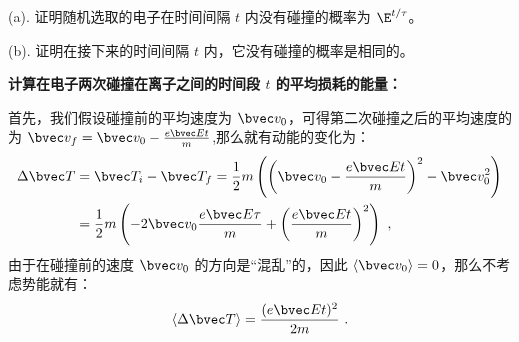 \begin{example}{}
(a). 证明随机选取的电子在时间间隔 $t$ 内没有碰撞的概率为 $\E^{t/\tau}$。

(b). 证明在接下来的时间间隔 $t$ 内，它没有碰撞的概率是相同的。
\end{example}
\begin{example}{}
\textbf{计算在电子两次碰撞在离子之间的时间段 $t$ 的平均损耗的能量：}

首先，我们假设碰撞前的平均速度为 $\bvec v_0$，可得第二次碰撞之后的平均速度的为 $\bvec v_f=\bvec v_0 -\frac{e\bvec E t}{m}$,那么就有动能的变化为：
\begin{align}
\Delta \bvec T &= \bvec T_i-\bvec T_f=\frac{1}{2}m\left(\left(\bvec v_0 -\frac{e\bvec E t}{m}\right)^2-\bvec v_0^2\right)\\
&=\frac{1}{2}m\left(-2\bvec v_0\frac{e\bvec E \tau}{m}+\left(\frac{e\bvec E t}{m}\right)^2\right)~,\\
\end{align}
由于在碰撞前的速度 $\bvec v_0$ 的方向是“混乱”的，因此 $\langle \bvec v_0\rangle = 0$，那么不考虑势能就有：
\begin{equation}
\langle \Delta \bvec T \rangle = \frac{(e\bvec E t)^2}{2m}~.
\end{equation}
\end{example}
